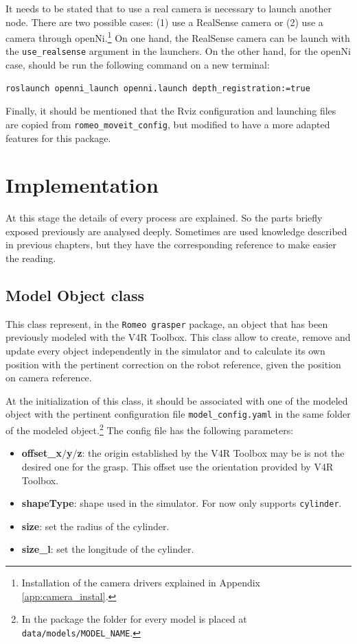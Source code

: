 \documentclass[12pt,a4paper,final,twoside,openright]{report}
\begin{document}
It needs to be stated that to use a real camera is necessary to launch another node. There are two possible cases: (1) use a RealSense camera or (2) use a camera through openNi.\footnote{Installation of the camera drivers explained in Appendix \ref{app:camera_instal}.} On one hand, the RealSense camera can be launch with the \texttt{use\_realsense} argument in the launchers. On the other hand, for the openNi case, should be run the following command on a new terminal:

\begin{lstlisting}[language=ROS]
roslaunch openni_launch openni.launch depth_registration:=true
\end{lstlisting}

Finally, it should be mentioned that the Rviz configuration and launching files are copied from \texttt{romeo\_moveit\_config}, but modified to have a more adapted features for this package. 


\chapter{Implementation}
\label{ch:implementation}

At this stage the details of every process are explained. So the parts briefly exposed previously are analysed deeply. Sometimes are used knowledge described in previous chapters, but they have the corresponding reference to make easier the reading.

\section{Model Object class}
\label{sec:model_object}

This class represent, in the \texttt{Romeo grasper} package, an object that has been previously modeled with the V4R Toolbox. This class allow to create, remove and update every object independently in the simulator and to calculate its own position with the pertinent correction on the robot reference, given the position on camera reference. 

At the initialization of this class, it should be associated with one of the modeled object with the pertinent configuration file \texttt{model\_config.yaml} in the same folder of the modeled object.\footnote{In the package the folder for every model is placed at \texttt{data/models/MODEL\_NAME}.} The config file has the following parameters:

\begin{itemize}
\item \textbf{offset\_x$/$y$/$z}: the origin established by the V4R Toolbox may be is not the desired one for the grasp. This offset use the orientation provided by V4R Toolbox.
\item \textbf{shapeType}: shape used in the simulator. For now only supports \texttt{cylinder}.
\item \textbf{size}: set the radius of the cylinder.
\item \textbf{size\_l}: set the longitude of the cylinder.
\end{itemize}
\end{document}
